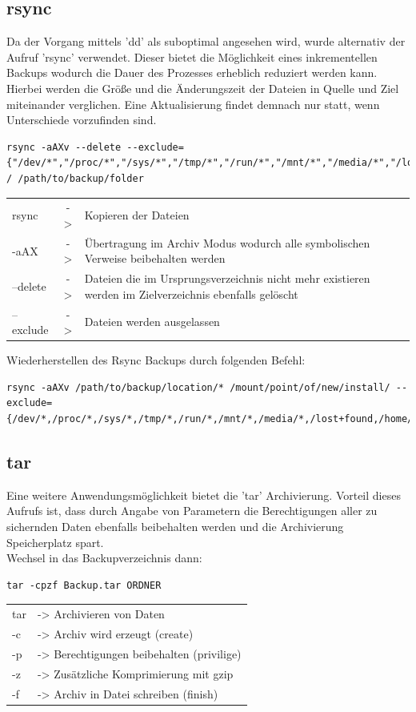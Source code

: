\subsection{rsync}
Da der Vorgang mittels 'dd' als suboptimal angesehen wird, wurde alternativ der Aufruf 'rsync' verwendet. Dieser bietet die Möglichkeit eines inkrementellen Backups wodurch die Dauer des Prozesses erheblich reduziert werden kann. Hierbei werden die Größe und die Änderungszeit der Dateien in Quelle und Ziel miteinander verglichen. Eine Aktualisierung findet demnach nur statt, wenn Unterschiede vorzufinden sind.
\begin{lstlisting}
rsync -aAXv --delete --exclude={"/dev/*","/proc/*","/sys/*","/tmp/*","/run/*","/mnt/*","/media/*","/lost+found"} / /path/to/backup/folder
\end{lstlisting}
\begin{tabular}{l c l}
rsync	&->& Kopieren der Dateien\\
-aAX	&->& Übertragung im Archiv Modus wodurch alle symbolischen Verweise beibehalten werden\\
--delete&->& Dateien die im Ursprungsverzeichnis nicht mehr existieren werden im Zielverzeichnis ebenfalls gelöscht\\
--exclude&->& Dateien werden ausgelassen\\
\end{tabular}
Wiederherstellen des Rsync Backups durch folgenden Befehl:
\begin{lstlisting}
rsync -aAXv /path/to/backup/location/* /mount/point/of/new/install/ --exclude={/dev/*,/proc/*,/sys/*,/tmp/*,/run/*,/mnt/*,/media/*,/lost+found,/home/*}
\end{lstlisting}

\subsection{tar} %
Eine weitere Anwendungsmöglichkeit bietet die 'tar' Archivierung. Vorteil dieses Aufrufs ist, dass durch Angabe von Parametern die Berechtigungen aller zu sichernden Daten ebenfalls beibehalten werden und die Archivierung Speicherplatz spart.\\
Wechsel in das Backupverzeichnis dann:
\begin{lstlisting}
tar -cpzf Backup.tar ORDNER
\end{lstlisting}
\begin{tabular}{l l}
tar	&-> Archivieren von Daten\\
-c	&-> Archiv wird erzeugt (create)\\
-p	&-> Berechtigungen beibehalten (privilige)\\
-z	&-> Zusätzliche Komprimierung mit gzip\\
-f	&-> Archiv in Datei schreiben (finish)\\
\end{tabular}
\newpage %

